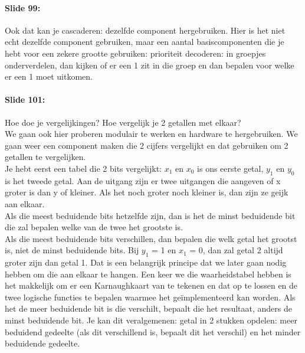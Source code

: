 \documentclass[10pt,a4paper]{book}
\begin{document}
\paragraph{Slide 99:} Ook dat kan je cascaderen: dezelfde component hergebruiken. Hier is het niet echt dezelfde component gebruiken, maar een aantal basiscomponenten die je hebt voor een zekere grootte gebruiken: prioriteit decoderen: in groepjes onderverdelen, dan kijken of er een 1 zit in die groep en dan bepalen voor welke er een 1 moet uitkomen. 

\paragraph{Slide 101:} Hoe doe je vergelijkingen? Hoe vergelijk je 2 getallen met elkaar?\\
We gaan ook hier proberen modulair te werken en hardware te hergebruiken. We gaan weer een component maken die 2 cijfers vergelijkt en dat gebruiken om 2 getallen te vergelijken.\\
Je hebt eerst een tabel die 2 bits vergelijkt: $x_1$ en $x_0$ is ons eerste getal, $y_1$ en $y_0$ is het tweede getal. Aan de uitgang zijn er twee uitgangen die aangeven of x groter is dan y of kleiner. Als het noch groter noch kleiner is, dan zijn ze geijk aan elkaar.\\
Als die meest beduidende bits hetzelfde zijn, dan is het de minst beduidende bit die zal bepalen welke van de twee het grootste is.\\
Als die meest beduidende bits verschillen, dan bepalen die welk getal het grootst is, niet de minst beduidende bits. Bij $y_1$ = 1 en $x_1$ = 0, dan zal getal 2 altijd groter zijn dan getal 1. Dat is een belangrijk principe dat we later gaan nodig hebben om die aan elkaar te hangen. Een keer we die waarheidstabel hebben is het makkelijk om er een Karnaughkaart van te tekenen en dat op te lossen en de twee logische functies te bepalen waarmee het ge\"implementeerd kan worden. Als het de meer beduidende bit is die verschilt, bepaalt die het resultaat, anders de minst beduidende bit. Je kan dit veralgemenen: getal in 2 stukken opdelen: meer beduidend gedeelte (als dit verschillend is, bepaalt dit het verschil) en het minder beduidende gedeelte.
\end{document}
